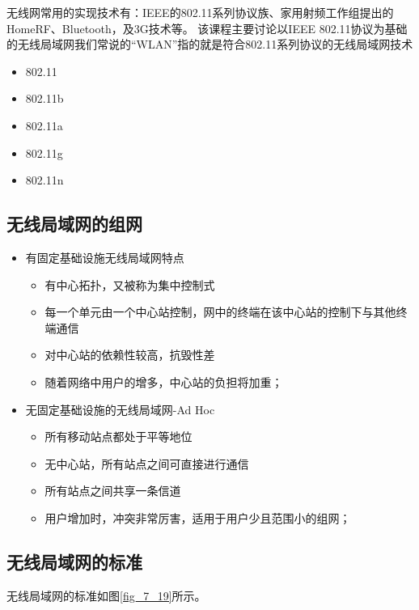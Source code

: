 无线网常用的实现技术有：IEEE的802.11系列协议族、家用射频工作组提出的HomeRF、Bluetooth，及3G技术等。
该课程主要讨论以IEEE 802.11协议为基础的无线局域网我们常说的“WLAN”指的就是符合802.11系列协议的无线局域网技术


\begin{itemize}
  \item 802.11
  \item 802.11b
  \item 802.11a
  \item 802.11g
  \item 802.11n
\end{itemize}



\subsection{无线局域网的组网}

\begin{itemize}
  \item 
有固定基础设施无线局域网特点


\begin{itemize}
  \item 
有中心拓扑，又被称为集中控制式
  \item 每一个单元由一个中心站控制，网中的终端在该中心站的控制下与其他终端通信
  \item 对中心站的依赖性较高，抗毁性差
  \item 随着网络中用户的增多，中心站的负担将加重；

\end{itemize}
  \item 
无固定基础设施的无线局域网-Ad Hoc

\begin{itemize}
  \item 
所有移动站点都处于平等地位
  \item 无中心站，所有站点之间可直接进行通信
  \item 所有站点之间共享一条信道
  \item 用户增加时，冲突非常厉害，适用于用户少且范围小的组网；

\end{itemize}

\end{itemize}
\subsection{无线局域网的标准}

无线局域网的标准如图\ref{fig_7_19}所示。


